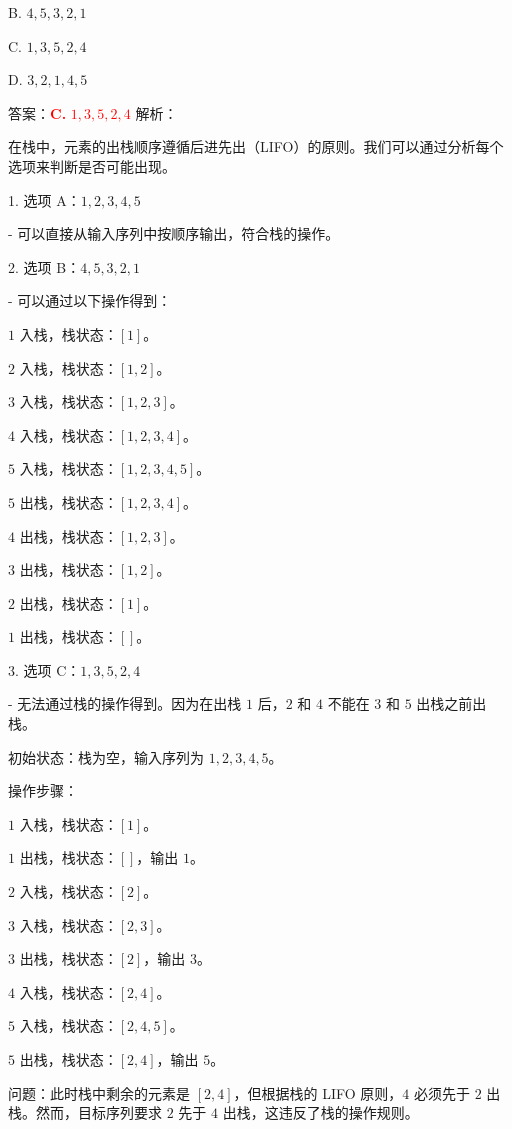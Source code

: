 \documentclass[lang=cn,newtx,10pt,scheme=chinese]{../../../elegantbook}
\begin{document}
\begin{enumerate}
    B. $4,5,3,2,1$ 

    C. $1,3,5,2,4$  

    D. $3,2,1,4,5$  

    答案：\textcolor{red}{\textbf{C.} $1,3,5,2,4$}
    解析：

    在栈中，元素的出栈顺序遵循后进先出（LIFO）的原则。我们可以通过分析每个选项来判断是否可能出现。

    1. 选项 A：$1,2,3,4,5$  

       - 可以直接从输入序列中按顺序输出，符合栈的操作。

    2. 选项 B：$4,5,3,2,1$

         - 可以通过以下操作得到：
    

            $1$ 入栈，栈状态：$[1]$。

            $2$ 入栈，栈状态：$[1, 2]$。

            $3$ 入栈，栈状态：$[1, 2, 3]$。

            $4$ 入栈，栈状态：$[1, 2, 3, 4]$。

            $5$ 入栈，栈状态：$[1, 2, 3, 4, 5]$。

            $5$ 出栈，栈状态：$[1, 2, 3, 4]$。

            $4$ 出栈，栈状态：$[1, 2, 3]$。

            $3$ 出栈，栈状态：$[1, 2]$。

            $2$ 出栈，栈状态：$[1]$。

            $1$ 出栈，栈状态：$[]$。

    3. 选项 C：$1,3,5,2,4$

       - 无法通过栈的操作得到。因为在出栈 $1$ 后，$2$ 和 $4$ 不能在 $3$ 和 $5$ 出栈之前出栈。

       初始状态：栈为空，输入序列为 $1, 2, 3, 4, 5$。

        操作步骤：

        $1$ 入栈，栈状态：$[1]$。

        $1$ 出栈，栈状态：$[]$，输出 $1$。

        $2$ 入栈，栈状态：$[2]$。

        $3$ 入栈，栈状态：$[2, 3]$。

        $3$ 出栈，栈状态：$[2]$，输出 $3$。

        $4$ 入栈，栈状态：$[2, 4]$。

        $5$ 入栈，栈状态：$[2, 4, 5]$。

        $5$ 出栈，栈状态：$[2, 4]$，输出 $5$。

        问题：此时栈中剩余的元素是 $[2, 4]$，但根据栈的 LIFO 原则，$4$ 必须先于 $2$ 出栈。然而，目标序列要求 $2$ 先于 $4$ 出栈，这违反了栈的操作规则。



\end{enumerate}
\end{document}
